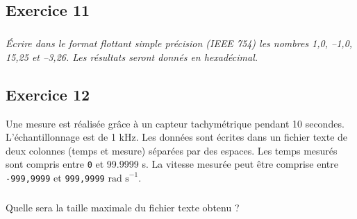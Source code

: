 \documentclass[10pt,fleqn]{article} %
\begin{document}
\begin{multicols}{2}
\subsection*{Exercice 11}
\setcounter{subparagraph}{0}
\subparagraph*{}\textit{Écrire dans le format flottant simple précision (IEEE 754) les nombres 
1,0,  	–1,0,  	15,25  et –3,26. Les résultats seront donnés en hexadécimal.}


\subsection*{Exercice 12}
\setcounter{subparagraph}{0}
Une mesure est réalisée grâce à un capteur tachymétrique pendant 10 secondes. L'échantillonnage est de 1 kHz. Les données sont écrites dans un fichier texte de deux colonnes (temps et mesure) séparées par des espaces. Les temps mesurés sont compris entre \texttt{0} et {99.9999} s. La vitesse mesurée peut être comprise entre \texttt{-999,9999} et \texttt{999,9999} $\text{rad s}^{-1}$.
\subparagraph*{}\textit{}{Quelle sera la taille maximale du fichier texte obtenu ?}

\end{multicols}
\end{document}
